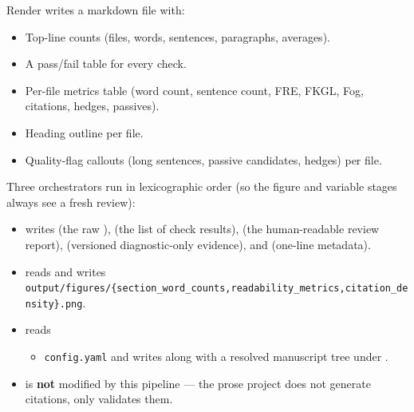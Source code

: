 \documentclass[
  ignorenonframetext,
]{beamer}
\providecommand{\tightlist}{%
  \setlength{\itemsep}{0pt}\setlength{\parskip}{0pt}}
\begin{document}
\begin{frame}{Render}
\protect{}\label{render}
 writes a markdown file
with:

\begin{itemize}
\tightlist
\item
  Top-line counts (files, words, sentences, paragraphs, averages).
\item
  A pass/fail table for every check.
\item
  Per-file metrics table (word count, sentence count, FRE, FKGL, Fog,
  citations, hedges, passives).
\item
  Heading outline per file.
\item
  Quality-flag callouts (long sentences, passive candidates, hedges) per
  file.
\end{itemize}

Three orchestrators run in lexicographic order (so the figure and
variable stages always see a fresh review):

\begin{itemize}
\tightlist
\item
   writes
   (the raw
  ),  (the list of
  check results),  (the human-readable
  review report),  (versioned
  diagnostic-only evidence), and 
  (one-line metadata).
\item
   reads
   and writes
  \texttt{output/figures/\{section\_word\_counts,readability\_metrics,citation\_density\}.png}.
\item
   reads

  \begin{itemize}
  \tightlist
  \item
    \texttt{config.yaml} and writes
     along with a
    resolved manuscript tree under .
  \end{itemize}
\item
   is \textbf{not} modified by this
  pipeline --- the prose project does not generate citations, only
  validates them.
\end{itemize}
\end{frame}
\end{document}
